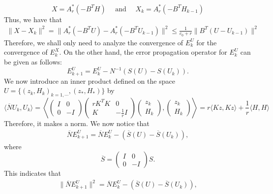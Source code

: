 \begin{itemize}
\begin{equation}
X = A_r^* (-B^TH) \quad \mbox{ and } \quad X_{k} = A_r^* (-B^T H_{k-1})
\end{equation}
Thus, we have that 
\begin{eqnarray*}
\|X - X_k\|^2 = \|A_r^* (-B^TU) - A_r^* (-B^T U_{k-1})\|^{2} \leq \frac{1}{c_0 + r} \|B^T( U - U_{k-1})\|^2 
\end{eqnarray*}
Therefore, we shall only need to analyze the convergence of $E_k^U$ for the convergence of $E_k^X$. On the other hand, the error propagation operator for $E_k^U$ can be given as follows: 
\begin{equation}
E_{k+1}^U = E_k^U - N^{-1} (S(U) - S(U_k)). 
\end{equation}
We now introduce an inner product defined on the space $U = \{(z_k, H_k)_{k=1,\cdots}, (z_*, H_*) \}$ by 
\begin{equation}
\langle \overline{N} U_k, U_k \rangle = \left \langle 
\begin{pmatrix}
I & 0\\
0 & -I
\end{pmatrix}
\begin{pmatrix}
r K^T K & 0\\
K & -\frac{1}{r} I
\end{pmatrix} \begin{pmatrix}
z_k \\
H_k
\end{pmatrix},  \begin{pmatrix}
z_k \\
H_k
\end{pmatrix} \right \rangle = r \langle Kz, Kz \rangle + \frac{1}{r} \langle H, H \rangle  
\end{equation}
Therefore, it makes a norm. We now notice that
\begin{eqnarray} 
\overline{N} E_{k+1}^U = \overline{N} E_k^U - (\overline{S}(U) - \overline{S}(U_k)), 
\end{eqnarray} 
where 
\begin{equation} 
\overline{S} = \begin{pmatrix}
I & 0\\
0 & -I
\end{pmatrix} S.
\end{equation} 
This indicates that 
\begin{eqnarray*}
\|\overline{N} E_{k+1}^U\|^2 = \overline{N} E_k^U - (\overline{S}(U) - \overline{S}(U_k)), 
\end{eqnarray*}


\end{itemize}
